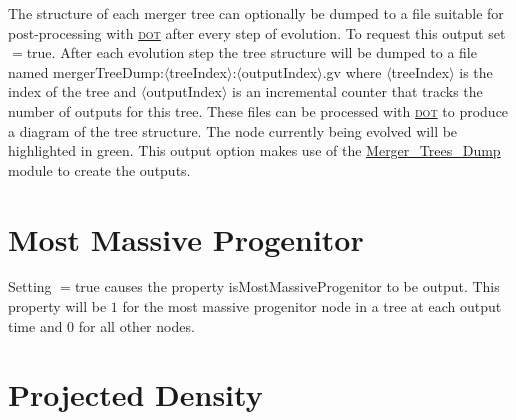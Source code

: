 The structure of each merger tree can optionally be dumped to a file suitable for post-processing with \href{http://www.graphviz.org/}{\normalfont \scshape dot} after every step of evolution. To request this output set {\normalfont \ttfamily [mergerTreesDumpStructure]}$=${\normalfont \ttfamily true}. After each evolution step the tree structure will be dumped to a file named {\normalfont \ttfamily mergerTreeDump:$\langle$treeIndex$\rangle$:$\langle$outputIndex$\rangle$.gv} where $\langle${\normalfont \ttfamily treeIndex}$\rangle$ is the index of the tree and $\langle${\normalfont \ttfamily outputIndex}$\rangle$ is an incremental counter that tracks the number of outputs for this tree. These files can be processed with \href{http://www.graphviz.org/}{\normalfont \scshape dot} to produce a diagram of the tree structure. The node currently being evolved will be highlighted in green. This output option makes use of the \href{https://github.com/galacticusorg/galacticus/releases/download/masterRelease/Galacticus_Source.pdf\#source.merger_trees_render_F90:merger_trees_render:merger_trees_render_dump}{\normalfont \ttfamily Merger\_Trees\_Dump} module to create the outputs.

\section{Most Massive Progenitor}

Setting {\normalfont \ttfamily [outputMostMassiveProgenitor]}$=${\normalfont \ttfamily true} causes the property {\normalfont \ttfamily isMostMassiveProgenitor} to be output. This property will be $1$ for the most massive progenitor node in a tree at each output time and $0$ for all other nodes.

\section{Projected Density}

